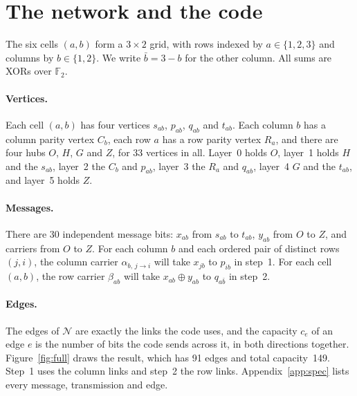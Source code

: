 \documentclass[11pt]{article}
\newcommand{\F}{\mathbb{F}_2}
\newcommand{\al}[3]{\alpha_{#1,\,#2\to#3}}
\begin{document}
\section{The network and the code}\label{sec:construction}

The six cells $(a,b)$ form a $3\times2$ grid, with rows indexed by $a\in\{1,2,3\}$ and columns by $b\in\{1,2\}$. We write $\bar b=3-b$ for the other column. All sums are XORs over $\F$.

\paragraph{Vertices.} Each cell $(a,b)$ has four vertices $s_{ab}$, $p_{ab}$, $q_{ab}$ and $t_{ab}$. Each column $b$ has a column parity vertex $C_b$, each row $a$ has a row parity vertex $R_a$, and there are four hubs $O$, $H$, $G$ and $Z$, for 33 vertices in all. Layer~0 holds $O$, layer~1 holds $H$ and the $s_{ab}$, layer~2 the $C_b$ and $p_{ab}$, layer~3 the $R_a$ and $q_{ab}$, layer~4 $G$ and the $t_{ab}$, and layer~5 holds $Z$.

\paragraph{Messages.} There are 30 independent message bits: $x_{ab}$ from $s_{ab}$ to $t_{ab}$, $y_{ab}$ from $O$ to $Z$, and carriers from $O$ to $Z$. For each column $b$ and each ordered pair of distinct rows $(j,i)$, the column carrier $\al{b}{j}{i}$ will take $x_{jb}$ to $p_{ib}$ in step~1. For each cell $(a,b)$, the row carrier $\beta_{ab}$ will take $x_{ab}\oplus y_{ab}$ to $q_{a\bar b}$ in step~2.

\paragraph{Edges.} The edges of $\mathcal N$ are exactly the links the code uses, and the capacity $c_e$ of an edge $e$ is the number of bits the code sends across it, in both directions together. Figure~\ref{fig:full} draws the result, which has 91 edges and total capacity~149. Step~1 uses the column links and step~2 the row links. Appendix~\ref{app:spec} lists every message, transmission and edge.
\end{document}
